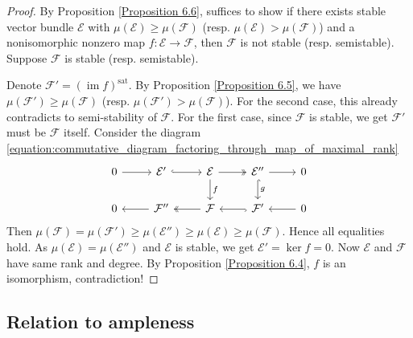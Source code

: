 \documentclass{ctexart}
\newcommand{\im}{\operatorname{im}}
\newcommand{\saturation}{\operatorname{sat}}
\begin{document}
\begin{proof}
    By Proposition \ref{Proposition 6.6}, suffices to show if there exists stable vector bundle $\mathcal{E}$ with $\mu(\mathcal{E}) \ge \mu(\mathcal{F})$ (resp. $\mu(\mathcal{E}) > \mu(\mathcal{F})$) and a nonisomorphic nonzero map $f: \mathcal{E} \rightarrow \mathcal{F}$,
    then $\mathcal{F}$ is not stable (resp. semistable).
    Suppose $\mathcal{F}$ is stable (resp. semistable).
    \par
    Denote $\mathcal{F}' = (\im f)^{\saturation}$.
    By Proposition \ref{Proposition 6.5}, we have $\mu(\mathcal{F}') \ge \mu(\mathcal{F})$ (resp. $\mu(\mathcal{F}') > \mu(\mathcal{F})$).
    For the second case, this already contradicts to semi-stability of $\mathcal{F}$.
    For the first case, since $\mathcal{F}$ is stable, we get $\mathcal{F}'$ must be $\mathcal{F}$ itself.
    Consider the diagram \ref{equation:commutative_diagram_factoring_through_map_of_maximal_rank}
    \begin{equation}
        \begin{tikzcd}
            0 \arrow[r] &
            \mathcal{E}' \arrow[r, hookrightarrow] &
            \mathcal{E} \arrow[r, twoheadrightarrow] \arrow[d, "f"] &
            \mathcal{E}'' \arrow[r] \arrow[d, hookrightarrow, "g"] &
            0 \\
            0 &
            \mathcal{F}'' \arrow[l] &
            \mathcal{F} \arrow[l, twoheadrightarrow] &
            \mathcal{F}' \arrow[l, hookrightarrow] &
            0 \arrow[l] 
        \end{tikzcd}
    \end{equation}
    Then $\mu(\mathcal{F}) = \mu(\mathcal{F}') \ge \mu(\mathcal{E}'') \ge \mu(\mathcal{E}) \ge \mu(\mathcal{F})$.
    Hence all equalities hold.
    As $\mu(\mathcal{E}) = \mu(\mathcal{E}'')$ and $\mathcal{E}$ is stable, we get $\mathcal{E}' = \ker f = 0$.
    Now $\mathcal{E}$ and $\mathcal{F}$ have same rank and degree.
    By Proposition \ref{Proposition 6.4}, $f$ is an isomorphism, contradiction!
\end{proof}

\subsection{Relation to ampleness}
\label{subsection:Stable_of_Vector_Bundles_on_Curves_Relation_to_ampleness}
\end{document}
